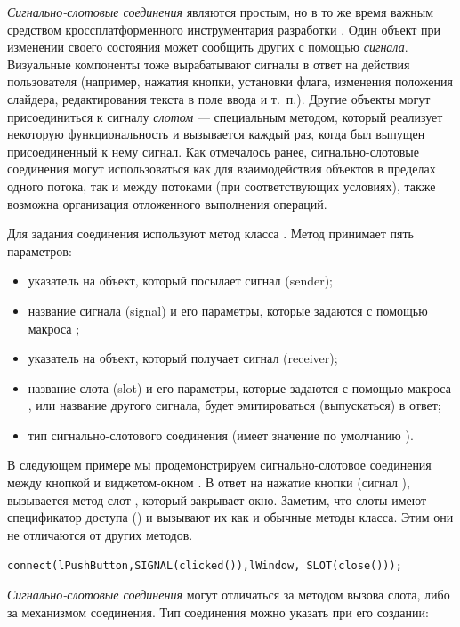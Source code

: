 \emph{Сигнально-слотовые соединения} являются простым, но в то же время важным
средством кроссплатформенного инструментария разработки .  Один объект при изменении своего состояния может сообщить
других с помощью \emph{сигнала}. Визуальные компоненты тоже вырабатывают сигналы в ответ на действия
пользователя (например, нажатия  кнопки, установки флага, изменения положения слайдера, редактирования текста в поле
ввода  и т.~п.). Другие объекты могут присоединиться к сигналу \emph{слотом} --- специальным методом,
который реализует некоторую функциональность  и вызывается каждый раз, когда был выпущен присоединенный к нему сигнал.
Как отмечалось ранее, сигнально-слотовые соединения могут использоваться как для взаимодействия объектов в пределах
одного потока, так и между потоками (при соответствующих условиях), также возможна организация отложенного выполнения
операций. 

Для задания соединения используют метод  класса . Метод принимает пять параметров:

\begin{itemize}
\item указатель на объект, который посылает сигнал (sender);
\item название сигнала (signal) и его параметры, которые задаются с помощью макроса ;
\item указатель на объект, который получает сигнал (receiver);
\item название слота (slot) и его параметры, которые задаются с помощью макроса , или название другого
сигнала, будет эмитироваться (выпускаться) в ответ;
\item тип сигнально-слотового соединения (имеет значение по умолчанию ).
\end{itemize}
В следующем примере мы продемонстрируем сигнально-слотовое соединения между кнопкой  и
виджетом-окном . В ответ на нажатие кнопки (сигнал ), вызывается
метод-слот , который закрывает окно. Заметим, что слоты имеют спецификатор доступа
() и вызывают их как и обычные методы класса. Этим они не отличаются от других
методов.

\lstinline!connect(lPushButton,SIGNAL(clicked()),lWindow, SLOT(close()));!

\emph{Сигнально-слотовые соединения} могут отличаться за методом вызова слота, либо за механизмом соединения.
Тип соединения можно указать при его создании:

